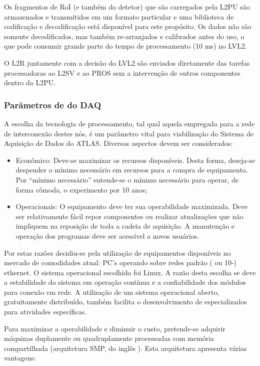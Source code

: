 Os fragmentos de RoI (e também do detetor) que são carregados pela L2PU são
armazenados e transmitidos em um formato particular e uma biblioteca de
codificação e decodificação \cite{aa:ef-urd, aa:ef-ooad} está disponível para
este propósito. Os dados não são somente decodificados, mas também
re-arranjados e calibrados antes do uso, o que pode consumir grande parte do
tempo de processamento (10 ms) no LVL2.

O L2R juntamente com a decisão do LVL2 são enviados diretamente das tarefas
processadoras ao L2SV e ao PROS sem a intervenção de outros componentes dentro
da L2PU.

\subsubsection{Parâmetros de  do DAQ}

A escolha da tecnologia de processamento, tal qual aquela empregada para a
rede de interconexão destes nós, é um parâmetro vital para viabilização do
Sistema de Aquisição de Dados do ATLAS. Diversos aspectos devem ser
considerados:

\begin{itemize}
\item Econômico: Deve-se maximizar os recursos disponíveis. Desta forma,
deseja-se despender o mínimo necessário em recursos para a compra de
equipamento. Por ``mínimo necessário'' entende-se o mínimo necessário para
operar, de forma cômoda, o experimento por 10 anos;

\item Operacionais: O equipamento deve ter sua operabilidade maximizada. Deve
ser relativamente fácil repor componentes ou realizar atualizações que não
impliquem na reposição de toda a cadeia de aquisição. A manutenção e operação
dos programas deve ser acessível a novos usuários.
\end{itemize}

Por estas razões decidiu-se pela utilização de equipamentos disponíveis no
mercado de comodidades atual: PC's operando sobre redes padrão (
ou 10-) ethernet. O sistema operacional escolhido foi Linux. A
razão desta escolha se deve a estabilidade do sistema em operação contínua e a
confiabilidade dos módulos para conexão em rede. A utilização de um sistema
operacional aberto, gratuitamente distribuído, também facilita o
desenvolvimento de  especializados para atividades específicas.

Para maximizar a operabilidade e diminuir o custo, pretende-se adquirir
máquinas duplamente ou quadruplamente processadas com memória compartilhada
(arquitetura SMP, do inglês ). Esta arquitetura
apresenta várias vantagens:

